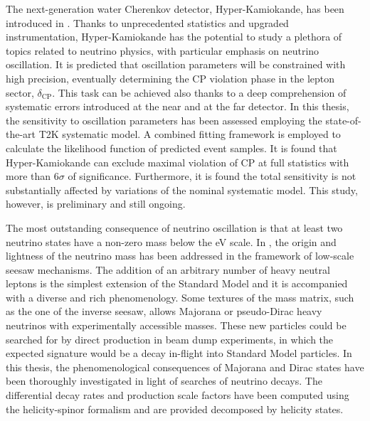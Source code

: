 The next-generation water Cherenkov detector, Hyper-Kamiokande, has been introduced in .
Thanks to unprecedented statistics and upgraded instrumentation, Hyper-Kamiokande has the potential %
to study a plethora of topics related to neutrino physics, with particular emphasis on neutrino oscillation.
It is predicted that oscillation parameters will be constrained with high precision, %
eventually determining the CP violation phase in the lepton sector, $\delta_\text{CP}$.
This task can be achieved also thanks to a deep comprehension of systematic errors %
introduced at the near and at the far detector.
In this thesis, the sensitivity to oscillation parameters has been assessed employing %
the state-of-the-art T2K systematic model.
A combined fitting framework is employed to calculate the likelihood function of predicted event samples.
It is found that Hyper-Kamiokande can exclude maximal violation of CP at full statistics %
with more than $6\sigma$ of significance.
Furthermore, it is found the total sensitivity is not substantially affected by variations of the nominal systematic model.
This study, however, is preliminary and still ongoing.

The most outstanding consequence of neutrino oscillation is that at least two neutrino states have %
a non-zero mass below the eV scale.
In , the origin and lightness of the neutrino mass has been addressed %
in the framework of low-scale seesaw mechanisms.
The addition of an arbitrary number of heavy neutral leptons is the simplest extension of the Standard Model %
and it is accompanied with a diverse and rich phenomenology.
Some textures of the mass matrix, such as the one of the inverse seesaw, %
allows Majorana or pseudo-Dirac heavy neutrinos with experimentally accessible masses.
These new particles could be searched for by direct production in beam dump experiments, %
in which the expected signature would be a decay in-flight into Standard Model particles.
In this thesis, the phenomenological consequences of Majorana and Dirac states have been thoroughly investigated %
in light of searches of neutrino decays.
The differential decay rates and production scale factors have been computed using %
the helicity-spinor formalism and are provided decomposed by helicity states.

